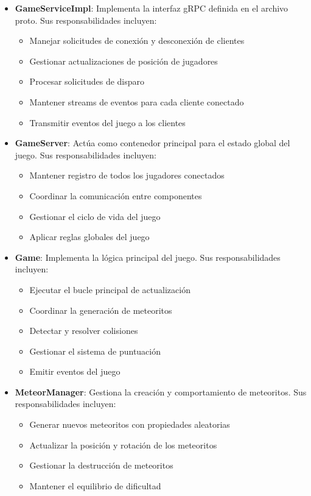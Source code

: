 \documentclass[12pt,letterpaper]{article}
\begin{document}
\begin{itemize}
    \item \textbf{GameServiceImpl}: Implementa la interfaz gRPC definida en el archivo proto. Sus responsabilidades incluyen:
    \begin{itemize}
        \item Manejar solicitudes de conexión y desconexión de clientes
        \item Gestionar actualizaciones de posición de jugadores
        \item Procesar solicitudes de disparo
        \item Mantener streams de eventos para cada cliente conectado
        \item Transmitir eventos del juego a los clientes
    \end{itemize}
    
    \item \textbf{GameServer}: Actúa como contenedor principal para el estado global del juego. Sus responsabilidades incluyen:
    \begin{itemize}
        \item Mantener registro de todos los jugadores conectados
        \item Coordinar la comunicación entre componentes
        \item Gestionar el ciclo de vida del juego
        \item Aplicar reglas globales del juego
    \end{itemize}
    
    \item \textbf{Game}: Implementa la lógica principal del juego. Sus responsabilidades incluyen:
    \begin{itemize}
        \item Ejecutar el bucle principal de actualización
        \item Coordinar la generación de meteoritos
        \item Detectar y resolver colisiones
        \item Gestionar el sistema de puntuación
        \item Emitir eventos del juego
    \end{itemize}
    
    \item \textbf{MeteorManager}: Gestiona la creación y comportamiento de meteoritos. Sus responsabilidades incluyen:
    \begin{itemize}
        \item Generar nuevos meteoritos con propiedades aleatorias
        \item Actualizar la posición y rotación de los meteoritos
        \item Gestionar la destrucción de meteoritos
        \item Mantener el equilibrio de dificultad
    \end{itemize}
    

\end{itemize}
\end{document}
